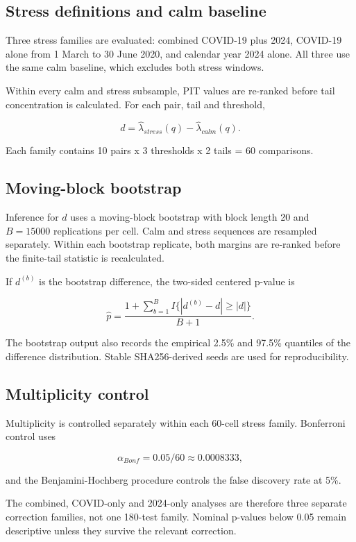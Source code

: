 \subsection{Stress definitions and calm baseline}

Three stress families are evaluated: combined COVID-19 plus 2024, COVID-19 alone from 1 March to 30 June 2020, and calendar year 2024 alone. All three use the same calm baseline, which excludes both stress windows.

Within every calm and stress subsample, PIT values are re-ranked before tail concentration is calculated. For each pair, tail and threshold,

\[
d=\hat\lambda_{stress}(q)-\hat\lambda_{calm}(q).
\]

Each family contains 10 pairs x 3 thresholds x 2 tails = 60 comparisons.

\subsection{Moving-block bootstrap}

Inference for \(d\) uses a moving-block bootstrap with block length 20 and \(B=15000\) replications per cell. Calm and stress sequences are resampled separately. Within each bootstrap replicate, both margins are re-ranked before the finite-tail statistic is recalculated.

If \(d^{(b)}\) is the bootstrap difference, the two-sided centered p-value is

\[
\hat p=
\frac{1+\sum_{b=1}^{B}I\{|d^{(b)}-d|\ge |d|\}}{B+1}.
\]

The bootstrap output also records the empirical 2.5\% and 97.5\% quantiles of the difference distribution. Stable SHA256-derived seeds are used for reproducibility.

\subsection{Multiplicity control}

Multiplicity is controlled separately within each 60-cell stress family. Bonferroni control uses

\[
\alpha_{Bonf}=0.05/60\approx0.0008333,
\]

and the Benjamini-Hochberg procedure controls the false discovery rate at 5\%.

The combined, COVID-only and 2024-only analyses are therefore three separate correction families, not one 180-test family. Nominal p-values below 0.05 remain descriptive unless they survive the relevant correction.

